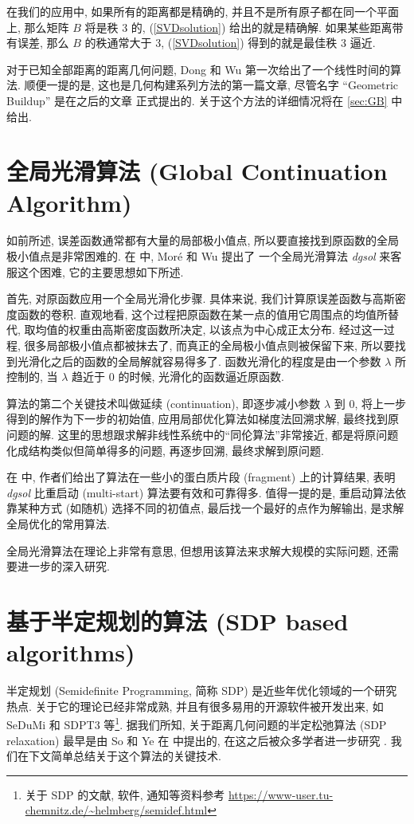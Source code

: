 \documentclass{CASthesis_zzk}
\begin{document}
在我们的应用中, 如果所有的距离都是精确的, 
并且不是所有原子都在同一个平面上, 那么矩阵 $B$ 将是秩 3 的, 
(\ref{SVDsolution}) 给出的就是精确解.
如果某些距离带有误差, 那么 $B$ 的秩通常大于 3, 
(\ref{SVDsolution}) 得到的就是最佳秩 3 逼近.

对于已知全部距离的距离几何问题, 
Dong 和 Wu \cite{Dong2002} 第一次给出了一个线性时间的算法.
顺便一提的是, 这也是几何构建系列方法的第一篇文章,
尽管名字 ``Geometric Buildup'' 是在之后的文章 \cite{Dong2003} 正式提出的.
关于这个方法的详细情况将在 \ref{sec:GB} 中给出.


\section{全局光滑算法 (Global Continuation Algorithm)}
\label{sec:Continuation}
如前所述, 误差函数通常都有大量的局部极小值点,
所以要直接找到原函数的全局极小值点是非常困难的.
在 \cite{More1997,More1999} 中, Mor\'e 和 Wu 提出了
一个全局光滑算法 \emph{dgsol} 来客服这个困难,
它的主要思想如下所述.

首先, 对原函数应用一个全局光滑化步骤. 
具体来说, 我们计算原误差函数与高斯密度函数的卷积.
直观地看, 这个过程把原函数在某一点的值用它周围点的均值所替代,
取均值的权重由高斯密度函数所决定, 以该点为中心成正太分布.
经过这一过程, 很多局部极小值点都被抹去了, 而真正的全局极小值点则被保留下来,
所以要找到光滑化之后的函数的全局解就容易得多了.
函数光滑化的程度是由一个参数 $\lambda$ 所控制的,
当 $\lambda$ 趋近于 0 的时候, 光滑化的函数逼近原函数.

算法的第二个关键技术叫做延续 (continuation), 
即逐步减小参数 $\lambda$ 到 0, 将上一步得到的解作为下一步的初始值,
应用局部优化算法如梯度法回溯求解, 最终找到原问题的解.
这里的思想跟求解非线性系统中的``同伦算法''非常接近,
都是将原问题化成结构类似但简单得多的问题, 再逐步回溯, 最终求解到原问题.

在 \cite{More1999} 中, 作者们给出了算法在一些小的蛋白质片段 (fragment)
上的计算结果, 表明 \emph{dgsol} 比重启动 (multi-start) 算法要有效和可靠得多.
值得一提的是, 重启动算法依靠某种方式 (如随机) 选择不同的初值点,
最后找一个最好的点作为解输出, 是求解全局优化的常用算法. 

全局光滑算法在理论上非常有意思, 但想用该算法来求解大规模的实际问题,
还需要进一步的深入研究.


\section{基于半定规划的算法 (SDP based algorithms)}
\label{sec:SDPalg}
半定规划 (Semidefinite Programming, 简称 SDP) 是近些年优化领域的一个研究热点.
关于它的理论已经非常成熟, 并且有很多易用的开源软件被开发出来,
如 SeDuMi 和 SDPT3 等\footnote{关于 SDP 的文献, 软件, 通知等资料参考
\url{https://www-user.tu-chemnitz.de/~helmberg/semidef.html}}. 
据我们所知, 关于距离几何问题的半定松弛算法 (SDP relaxation) 
最早是由 So 和 Ye 在 \cite{So2006} 中提出的, 
在这之后被众多学者进一步研究 \cite{Biswas2006-1,Biswas2008,Shamsi2010,Fang2013}. 
我们在下文简单总结关于这个算法的关键技术.
\end{document}
